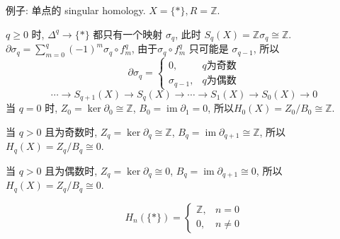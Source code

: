 \documentclass{ctexart}
\DeclareMathOperator{\im}{im}
\begin{document}
\begin{enumerate}
例子: 单点的 singular homology. $X = \{\ast\}, R=\mathbb{Z}$.

$q\geq0$ 时, $\Delta^q \to \{\ast\}$ 都只有一个映射 $\sigma_q$, 此时 $S_q(X) = \mathbb{Z}\sigma_q \cong \mathbb{Z}$.
$\partial\sigma_q = \sum\limits_{m=0}^{q}(-1)^m\sigma_q\circ f_m^q$, 由于$\sigma_q\circ f_m^q$ 只可能是 $\sigma_{q-1}$, 所以
\[
\partial\sigma_q =
\begin{cases}
0, & q\text{为奇数}\\
\sigma_{q-1}, & q\text{为偶数}
\end{cases}
\]
\[
\cdots\to S_{q+1}(X)\to S_q(X) \to\cdots \to S_1(X)\to S_0(X)\to 0
\]
当 $q=0$ 时, $Z_0 = \ker\partial_0 \cong \mathbb{Z}$, $B_0 = \im\partial_1 = 0$, 所以$H_0(X) = Z_0/B_0 \cong \mathbb{Z}$.

当 $q > 0$ 且为奇数时, $Z_q = \ker\partial_q \cong \mathbb{Z}$, $B_q = \im\partial_{q+1} \cong \mathbb{Z}$, 所以 $H_q(X) = Z_q/B_q \cong 0$.

当 $q > 0$ 且为偶数时, $Z_q = \ker\partial_q \cong 0$, $B_q = \im\partial_{q+1} \cong 0$, 所以 $H_q(X) = Z_q/B_q \cong 0$.

\[
H_n(\{\ast\}) =
\begin{cases}
\mathbb{Z}, & n = 0\\
0, & n \neq 0
\end{cases}
\]
\end{enumerate}
\newpage
\printbibliography
\end{document}
